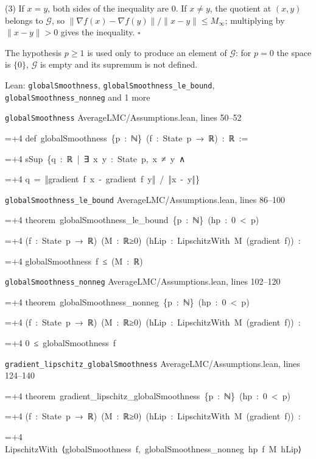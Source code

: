 \documentclass[11pt,a4paper]{article}
\newlength{\leancharwidth}
\newenvironment{leancode}{\par\smallskip\begingroup\ttfamily\footnotesize\raggedright
  \settowidth{\leancharwidth}{M}\setlength{\parskip}{0pt}\setlength{\parindent}{0pt}
  \frenchspacing}{\par\endgroup\smallskip}
\newcommand{\leanline}[2]{\hangindent=\dimexpr#1\leancharwidth+4\leancharwidth\relax
  \hangafter=1\noindent\hspace*{#1\leancharwidth}#2\par}
\newcommand{\leansource}[1]{\par{\footnotesize\color{leanmuted}#1}\par}
\begin{document}
(3) If \(x=y\), both sides of the inequality are \(0\). If \(x\ne y\), the quotient at \((x,y)\) belongs to \(\mathcal G\), so \(\|\nabla f(x)-\nabla f(y)\|/\|x-y\|\le M_\infty\); multiplying by \(\|x-y\|>0\) gives the inequality. \(\square\)




The hypothesis \(p\ge1\) is used only to produce an element of \(\mathcal G\): for \(p=0\) the space is \(\{0\}\), \(\mathcal G\) is empty and its supremum is not defined.

\begin{leanbox}{Lean: \texttt{globalSmoothness}, \texttt{globalSmoothness\_\allowbreak{}le\_\allowbreak{}bound}, \texttt{globalSmoothness\_\allowbreak{}nonneg} and 1 more}
\leansource{\texttt{globalSmoothness} \quad AverageLMC/\allowbreak{}Assumptions.lean, lines 50–52}
\begin{leancode}
\leanline{0}{def\ globalSmoothness\ \{p\ :\ ℕ\}\ (f\ :\ State\ p\ →\ ℝ)\ :\ ℝ\ :=}
\leanline{2}{sSup\ \{q\ :\ ℝ\ |\ ∃\ x\ y\ :\ State\ p,\ x\ ≠\ y\ ∧}
\leanline{4}{q\ =\ ‖gradient\ f\ x\ -\ gradient\ f\ y‖\ /\ ‖x\ -\ y‖\}}
\end{leancode}
\leansource{\texttt{globalSmoothness\_\allowbreak{}le\_\allowbreak{}bound} \quad AverageLMC/\allowbreak{}Assumptions.lean, lines 86–100}
\begin{leancode}
\leanline{0}{theorem\ globalSmoothness\_le\_bound\ \{p\ :\ ℕ\}\ (hp\ :\ 0\ <\ p)}
\leanline{4}{(f\ :\ State\ p\ →\ ℝ)\ (M\ :\ ℝ≥0)\ (hLip\ :\ LipschitzWith\ M\ (gradient\ f))\ :}
\leanline{4}{globalSmoothness\ f\ ≤\ (M\ :\ ℝ)}
\end{leancode}
\leansource{\texttt{globalSmoothness\_\allowbreak{}nonneg} \quad AverageLMC/\allowbreak{}Assumptions.lean, lines 102–120}
\begin{leancode}
\leanline{0}{theorem\ globalSmoothness\_nonneg\ \{p\ :\ ℕ\}\ (hp\ :\ 0\ <\ p)}
\leanline{4}{(f\ :\ State\ p\ →\ ℝ)\ (M\ :\ ℝ≥0)\ (hLip\ :\ LipschitzWith\ M\ (gradient\ f))\ :}
\leanline{4}{0\ ≤\ globalSmoothness\ f}
\end{leancode}
\leansource{\texttt{gradient\_\allowbreak{}lipschitz\_\allowbreak{}globalSmoothness} \quad AverageLMC/\allowbreak{}Assumptions.lean, lines 124–140}
\begin{leancode}
\leanline{0}{theorem\ gradient\_lipschitz\_globalSmoothness\ \{p\ :\ ℕ\}\ (hp\ :\ 0\ <\ p)}
\leanline{4}{(f\ :\ State\ p\ →\ ℝ)\ (M\ :\ ℝ≥0)\ (hLip\ :\ LipschitzWith\ M\ (gradient\ f))\ :}
\leanline{4}{LipschitzWith\ ⟨globalSmoothness\ f,\ globalSmoothness\_nonneg\ hp\ f\ M\ hLip⟩}

\end{leancode}
\end{leanbox}
\end{document}
